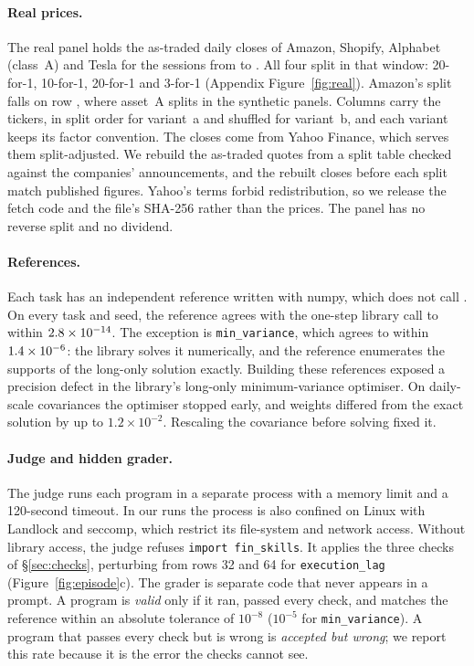 \paragraph{Real prices.}
The real panel holds the as-traded daily closes of Amazon, Shopify, Alphabet (class~A) and
Tesla for the \NRealRows{} sessions from \RealFirst{} to \RealLast{}. All four split in that
window: 20-for-1, 10-for-1, 20-for-1 and 3-for-1 (Appendix Figure~\ref{fig:real}).
Amazon's split falls on row
\NRealSplitRow{}, where asset~A splits in the synthetic panels. Columns carry the tickers, in
split order for variant~a and shuffled for variant~b, and each variant keeps its factor
convention. The closes come from Yahoo
Finance, which serves them split-adjusted. We rebuild the as-traded quotes from a split table
checked against the companies' announcements, and the rebuilt closes before each split match
published figures. Yahoo's terms forbid redistribution, so we release the fetch code and the
file's SHA-256 rather than the prices. The panel has no reverse split and no dividend.

\paragraph{References.}
Each task has an independent reference written with numpy, which does not call \lib{}. On
every task and seed, the reference agrees with the one-step library call to within
$2.8\times10^{-14}$. The exception is \texttt{min\_variance}, which agrees to within
$1.4\times10^{-6}$: the library solves it numerically, and the reference enumerates the
supports of the long-only solution exactly. Building these references exposed a precision
defect in the library's long-only minimum-variance optimiser. On daily-scale covariances the
optimiser stopped early, and weights differed from the exact solution by up to
$1.2\times10^{-2}$. Rescaling the covariance before solving fixed it.

\paragraph{Judge and hidden grader.}
\label{sec:grader}
The judge runs each program in a separate process with a memory limit and a 120-second
timeout. In our runs the process is also confined on Linux with Landlock and seccomp, which
restrict its file-system and network access. Without library access, the judge refuses
\texttt{import fin\_skills}. It applies the three checks of \S\ref{sec:checks}, perturbing
from rows 32 and 64 for \texttt{execution\_lag} (Figure~\ref{fig:episode}c). The grader is
separate code that never
appears in a prompt. A program is \emph{valid} only if it ran, passed every check, and
matches the reference within an absolute tolerance of $10^{-8}$ ($10^{-5}$ for
\texttt{min\_variance}). A program that passes every check but is wrong is \emph{accepted but
wrong}; we report this rate because it is the error the checks cannot see.


